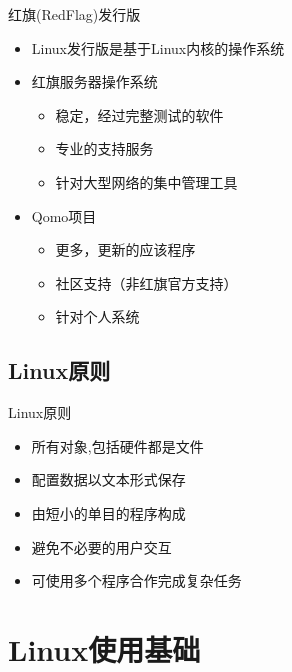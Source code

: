 \begin{frame}{红旗(RedFlag)发行版}
\begin{itemize}
\item Linux发行版是基于Linux内核的操作系统
\item 红旗服务器操作系统

\begin{itemize}
\item 稳定，经过完整测试的软件
\item 专业的支持服务
\item 针对大型网络的集中管理工具
\end{itemize}
\item Qomo项目

\begin{itemize}
\item 更多，更新的应该程序
\item 社区支持（非红旗官方支持）
\item 针对个人系统
\end{itemize}
\end{itemize}

\end{frame}

\subsection{Linux原则}


\begin{frame}{Linux原则}


\begin{itemize}
\item 所有对象,包括硬件都是文件
\item 配置数据以文本形式保存 
\item 由短小的单目的程序构成 
\item 避免不必要的用户交互 
\item 可使用多个程序合作完成复杂任务
\end{itemize}

\end{frame}

\section{Linux使用基础}



